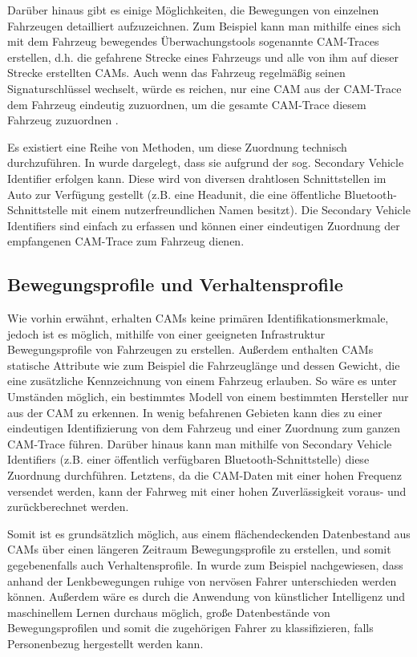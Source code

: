 Darüber hinaus gibt es einige Möglichkeiten, die Bewegungen von einzelnen Fahrzeugen detailliert aufzuzeichnen. Zum Beispiel kann man mithilfe eines sich mit dem Fahrzeug bewegendes Überwachungstools sogenannte CAM-Traces erstellen, d.h. die gefahrene Strecke eines Fahrzeugs und alle von ihm auf dieser Strecke erstellten CAMs. Auch wenn das Fahrzeug regelmäßig seinen Signaturschlüssel wechselt, würde es reichen, nur eine CAM aus der CAM-Trace dem Fahrzeug eindeutig zuzuordnen, um die gesamte CAM-Trace diesem Fahrzeug zuzuordnen \cite{Kiometzis2017}. 

Es existiert eine Reihe von Methoden, um diese Zuordnung technisch durchzuführen. In \cite{Ullmann2016} wurde dargelegt, dass sie aufgrund der sog. Secondary Vehicle Identifier erfolgen kann. Diese wird von diversen drahtlosen Schnittstellen im Auto zur Verfügung gestellt (z.B. eine Headunit, die eine öffentliche Bluetooth-Schnittstelle mit einem nutzerfreundlichen Namen besitzt). Die Secondary Vehicle Identifiers sind einfach zu erfassen und können einer eindeutigen Zuordnung der empfangenen CAM-Trace zum Fahrzeug dienen. 

\subsection{Bewegungsprofile und Verhaltensprofile}
\label{sec:SecondContentSection:SecondSubsection:FirstSubSubsection}

Wie vorhin erwähnt, erhalten CAMs keine primären Identifikationsmerkmale, jedoch ist es möglich, mithilfe von einer geeigneten Infrastruktur Bewegungsprofile von Fahrzeugen zu erstellen. Außerdem enthalten CAMs statische Attribute wie zum Beispiel die Fahrzeuglänge und dessen Gewicht, die eine zusätzliche Kennzeichnung von einem Fahrzeug erlauben. So wäre es unter Umständen möglich, ein bestimmtes Modell von einem bestimmten Hersteller nur aus der CAM zu erkennen. In wenig befahrenen Gebieten kann dies zu einer eindeutigen Identifizierung von dem Fahrzeug und einer Zuordnung zum ganzen CAM-Trace führen. Darüber hinaus kann man mithilfe von Secondary Vehicle Identifiers (z.B. einer öffentlich verfügbaren Bluetooth-Schnittstelle) diese Zuordnung durchführen. Letztens, da die CAM-Daten mit einer hohen Frequenz versendet werden, kann der Fahrweg mit einer hohen Zuverlässigkeit voraus- und zurückberechnet werden. 

Somit ist es grundsätzlich möglich, aus einem flächendeckenden Datenbestand aus CAMs über einen längeren Zeitraum Bewegungsprofile zu erstellen, und somit gegebenenfalls auch Verhaltensprofile. In \cite{Dettki2005} wurde zum Beispiel nachgewiesen, dass anhand der Lenkbewegungen ruhige von nervösen Fahrer unterschieden werden können. Außerdem wäre es durch die Anwendung von künstlicher Intelligenz und maschinellem Lernen durchaus möglich, große Datenbestände von Bewegungsprofilen und somit die zugehörigen Fahrer zu klassifizieren, falls Personenbezug hergestellt werden kann. 

